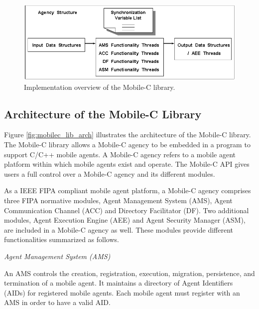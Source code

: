 \documentclass[11pt]{report}
\begin{document}
\begin{figure}[!t]
\begin{center}
   \includegraphics[scale=0.5]{figure/mobilec_lib_imp}
   \caption{Implementation overview of the Mobile-C library.}
   \label{fig:mobilec_lib_imp}
\end{center}
\end{figure}

\subsection{Architecture of the Mobile-C Library \label{mobilec_arch}}
Figure \ref{fig:mobilec_lib_arch} illustrates the architecture of the 
Mobile-C library.
The Mobile-C library allows a Mobile-C agency to be embedded in a program to 
support C/C++ mobile agents.
A Mobile-C agency refers to a mobile agent platform within which mobile agents 
exist and operate.
The Mobile-C API gives users a full control over a Mobile-C agency and its 
different modules.
 
As a IEEE FIPA compliant mobile agent platform, a Mobile-C agency 
comprises three FIPA normative modules, Agent Management System (AMS), 
Agent Communication Channel (ACC) and Directory Facilitator (DF). 
Two additional modules, Agent Execution Engine (AEE) and 
Agent Security Manager (ASM), are included in a Mobile-C agency as well.
These modules provide different functionalities summarized as follows.

\textit{Agent Management System (AMS)}

\noindent
An AMS controls the creation, registration, execution, migration, 
persistence, and termination of a mobile agent. 
It maintains a directory of Agent Identifiers (AIDs) for registered mobile 
agents. 
Each mobile agent must register with an AMS in order to have a valid AID.
\end{document}
